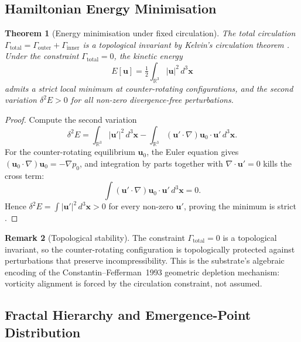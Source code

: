 \documentclass[11pt,a4paper]{article}
\theoremstyle{plain}
\newtheorem{theorem}{Theorem}[section]
\theoremstyle{definition}
\newtheorem{remark}[theorem]{Remark}
\begin{document}
\subsection{Hamiltonian Energy Minimisation}

\begin{theorem}[Energy minimisation under fixed circulation]
\label{thm:energy}
The total circulation
$\Gamma_{\mathrm{total}} = \Gamma_{\mathrm{outer}} +
\Gamma_{\mathrm{inner}}$ is a topological invariant by Kelvin's
circulation theorem \cite{arnold1966}. Under the constraint
$\Gamma_{\mathrm{total}} = 0$, the kinetic energy
\[
E[\mathbf{u}] = \tfrac{1}{2}\int_{\mathbb{R}^{3}}|\mathbf{u}|^{2}\,d^{3}\mathbf{x}
\]
admits a strict local minimum at counter-rotating configurations, and
the second variation $\delta^{2}E > 0$ for all non-zero
divergence-free perturbations.
\end{theorem}

\begin{proof}
Compute the second variation
\[
\delta^{2}E = \int_{\mathbb{R}^{3}}|\mathbf{u}'|^{2}\,d^{3}\mathbf{x}
   - \int_{\mathbb{R}^{3}}(\mathbf{u}'\cdot\nabla)\mathbf{u}_{0}\cdot\mathbf{u}'\,d^{3}\mathbf{x}.
\]
For the counter-rotating equilibrium $\mathbf{u}_{0}$, the
Euler equation gives $(\mathbf{u}_{0}\cdot\nabla)\mathbf{u}_{0} =
-\nabla p_{0}$, and integration by parts together with
$\nabla\cdot\mathbf{u}' = 0$ kills the cross term:
\[
\int(\mathbf{u}'\cdot\nabla)\mathbf{u}_{0}\cdot\mathbf{u}'\,d^{3}\mathbf{x} = 0.
\]
Hence $\delta^{2}E = \int|\mathbf{u}'|^{2}\,d^{3}\mathbf{x} > 0$ for
every non-zero $\mathbf{u}'$, proving the minimum is strict
\cite{holm1985}.
\end{proof}

\begin{remark}[Topological stability]
\label{rem:topology}
The constraint $\Gamma_{\mathrm{total}} = 0$ is a topological
invariant, so the counter-rotating configuration is
topologically protected against perturbations that preserve
incompressibility. This is the substrate's algebraic encoding of the
Constantin--Fefferman~1993 \cite{constantinFefferman1993} geometric
depletion mechanism: vorticity alignment is forced by the
circulation constraint, not assumed.
\end{remark}

\subsection{Fractal Hierarchy and Emergence-Point Distribution}
\end{document}
